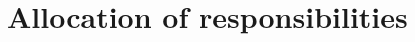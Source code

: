 \documentclass[12pt,twoside]{article}
\begin{document}
\maketitle


%
%








\section{Allocation of responsibilities}
\label{sec:allocation-of-responsibilities}

\end{document}
